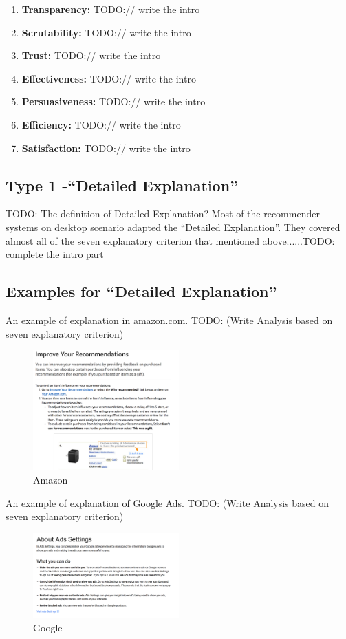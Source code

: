     \begin{enumerate}
        \item \textbf{Transparency:} TODO:// write the intro
        \item \textbf{Scrutability:} TODO:// write the intro
        \item \textbf{Trust:} TODO:// write the intro
        \item \textbf{Effectiveness:} TODO:// write the intro
        \item \textbf{Persuasiveness:} TODO:// write the intro
        \item \textbf{Efficiency:} TODO:// write the intro
        \item \textbf{Satisfaction:} TODO:// write the intro
    \end{enumerate}

\subsection{Type 1 -``Detailed Explanation''}
    TODO: The definition of Detailed Explanation?
    Most of the recommender systems on desktop scenario adapted the ``Detailed Explanation''.
    They covered almost all of the seven explanatory criterion that mentioned above......TODO: complete the intro part
\subsection{Examples for ``Detailed Explanation''}
    An example of explanation in amazon.com.
    TODO: (Write Analysis based on seven explanatory criterion) 
    \begin{figure}[H]
        \centering
        \includegraphics[width=0.5\textwidth]{figures/amazon1}
        \caption{Amazon}
        \label{fig:amazon1}
    \end{figure}
    An example of explanation of Google Ads.
    TODO:  (Write Analysis based on seven explanatory criterion) 
    \begin{figure}[H]
        \centering
        \includegraphics[width=0.5\textwidth]{figures/google1}
        \caption{Google}
        \label{fig:google1}
    \end{figure}
